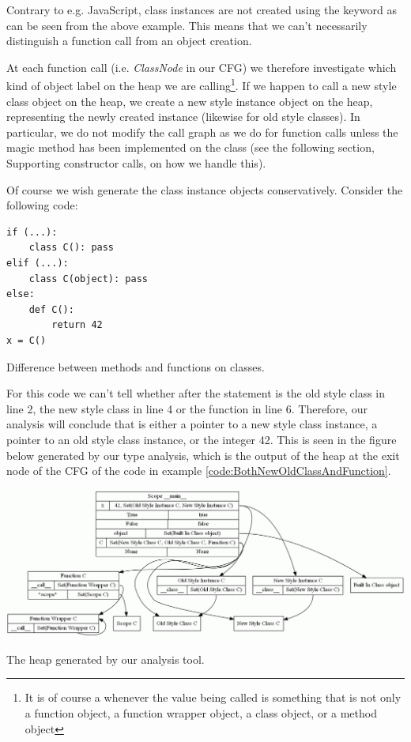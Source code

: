 Contrary to e.g. JavaScript, class instances are not created using the  keyword as can be seen from the above example. This means that we can't necessarily distinguish a function call from an object creation.

At each function call (i.e. \textit{ClassNode} in our CFG) we therefore investigate which kind of object label on the heap we are calling\footnote{It is of course a  whenever the value being called is something that is not only a function object, a function wrapper object, a class object, or a method object}. If we happen to call a new style class object on the heap, we create a new style instance object on the heap, representing the newly created instance (likewise for old style classes). In particular, we do not modify the call graph as we do for function calls unless the magic method  has been implemented on the class (see the following section, Supporting constructor calls, on how we handle this).

Of course we wish generate the class instance objects conservatively. Consider the following code:

\begin{listing}[H]
	\begin{verbatim}
if (...):
	class C(): pass
elif (...):
	class C(object): pass
else:
	def C():
		return 42
x = C()
	\end{verbatim}
	\caption{Difference between methods and functions on classes.}\label{code:BothNewOldClassAndFunction}
\end{listing}

For this code we can't tell whether  after the  statement is the old style class in line 2, the new style class in line 4 or the function in line 6. Therefore, our analysis will conclude that  is either a pointer to a new style class instance, a pointer to an old style class instance, or the integer 42. This is seen in the figure below generated by our type analysis, which is the output of the heap at the exit node of the CFG of the code in example \ref{code:BothNewOldClassAndFunction}.

\begin{listing}[H]
	\begin{center}
		\includegraphics[width=1\textwidth]{images/BothNewOldClassAndFunction.png}
	\end{center}
	\vspace{-10pt}
	\caption{The heap generated by our analysis tool.}
	\label{fig:BothNewOldClassAndFunction}
\end{listing}

